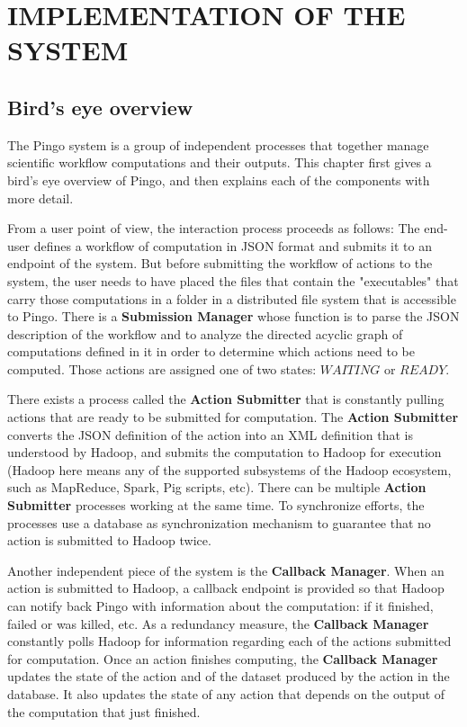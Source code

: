 \chapter{IMPLEMENTATION OF THE SYSTEM}
\label{chap:implementation}
\section{Bird's eye overview}
The Pingo system is a group of independent processes that together manage scientific workflow computations and their outputs.  This chapter first gives a bird's eye overview of Pingo, and then explains each of the components with more detail. 

From a user point of view, the interaction process proceeds as follows: The end-user defines a workflow of computation in JSON format and submits it to an endpoint of the system. But before submitting the workflow of actions to the system, the user needs to have placed the files that contain the "executables" that carry those computations in a folder in a distributed file system that is accessible to Pingo. There is a \textbf{Submission Manager} whose function is to parse the JSON description of the workflow and to analyze the directed acyclic graph of computations defined in it in order to determine which actions need to be computed.  Those actions are assigned one of two states: $WAITING$ or $READY$.

There exists a process called the \textbf{Action Submitter} that is constantly pulling actions that are ready to be submitted for computation. The \textbf{Action Submitter} converts the JSON definition of the action into an XML definition that is understood by Hadoop, and submits the computation to Hadoop for execution (Hadoop here means any of the supported subsystems of the Hadoop ecosystem, such as MapReduce, Spark, Pig scripts, etc). There can be multiple \textbf{Action Submitter} processes working at the same time.  To synchronize efforts, the processes use a database as synchronization mechanism to guarantee that no action is submitted to Hadoop twice.

Another independent piece of the system is the \textbf{Callback Manager}.  When an action is submitted  to Hadoop, a callback endpoint is provided so that Hadoop can notify back Pingo with information about the computation: if it finished, failed or was killed, etc.  As a redundancy measure, the \textbf{Callback Manager} constantly polls Hadoop for information regarding each of the actions submitted for computation.  Once an action finishes computing, the \textbf{Callback Manager} updates the state of the action and of the dataset produced by the action in the database. It also updates the state of any action that depends on the output of the computation that just finished.

